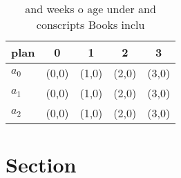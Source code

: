 \documentclass[a4paper]{article}
\begin{document}
\begin{table}
\begin{adjustbox}{width=0.6\columnwidth}
\begin{tabular}{|l|l|l|l|l|}
\hline
\textbf{plan} & \multicolumn{1}{c|}{\textbf{0}} & \multicolumn{1}{c|}{\textbf{1}} & \multicolumn{1}{c|}{\textbf{2}} & \multicolumn{1}{c|}{\textbf{3}} \\ \hline
\textbf{$a_0$}  & (0,0) & (1,0) & (2,0) & (3,0) \\ \hline
\textbf{$a_1$}  & (0,0) & (1,0) & (2,0) & (3,0) \\ \hline
\textbf{$a_2$}  & (0,0) & (1,0) & (2,0) & (3,0) \\ \hline
\end{tabular}
\end{adjustbox}
\caption{ and weeks o age under and conscripts Books inclu
}
\end{table}

\section{Section}
\end{document}
